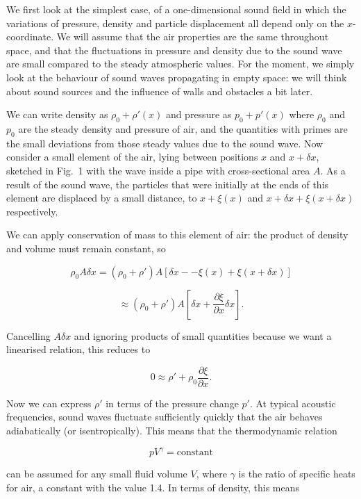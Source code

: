   We first look at the simplest case, of a one-dimensional sound field in which 
  the variations of pressure, density and particle displacement all depend only 
  on the $x$-coordinate. We will assume that the air properties are the same 
  throughout space, and that the fluctuations in pressure and density due to 
  the sound wave are small compared to the steady atmospheric values. For the 
  moment, we simply look at the behaviour of sound waves propagating in empty 
  space: we will think about sound sources and the influence of walls and 
  obstacles a bit later. 

  We can write density as $\rho_0 + \rho'(x)$ and pressure as $p_0 + p'(x)$ 
  where $\rho_0$ and $p_0$ are the steady density and pressure of air, and the 
  quantities with primes are the small deviations from those steady values due 
  to the sound wave. Now consider a small element of the air, lying between 
  positions $x$ and $x+\delta x$, sketched in Fig.\ 1 with the wave inside a 
  pipe with cross-sectional area $A$. As a result of the sound wave, the 
  particles that were initially at the ends of this element are displaced by a 
  small distance, to $x+\xi(x)$ and $x + \delta x + \xi(x + \delta x)$ 
  respectively. 

  We can apply conservation of mass to this element of air: the product of 
  density and volume must remain constant, so 

  $$\rho_0 A \delta x = (\rho_0 + \rho') A [\delta x -- \xi(x) + \xi(x+ \delta 
  x)] $$ 

  $$\approx (\rho_0 + \rho') A \left[\delta x + \frac{\partial \xi}{\partial x} 
  \delta x \right] . \tag{1}$$ 

  Cancelling $A \delta x$ and ignoring products of small quantities because we 
  want a linearised relation, this reduces to 

  $$0 \approx \rho' + \rho_0 \frac{\partial \xi}{\partial x} .\tag{2}$$ 

  Now we can express $\rho'$ in terms of the pressure change $p'$. At typical 
  acoustic frequencies, sound waves fluctuate sufficiently quickly that the air 
  behaves adiabatically (or isentropically). This means that the thermodynamic 
  relation 

  $$p V^\gamma = \mathrm{constant} \tag{3}$$ 

  can be assumed for any small fluid volume $V$, where $\gamma$ is the ratio of 
  specific heats for air, a constant with the value 1.4. In terms of density, 
  this means 


